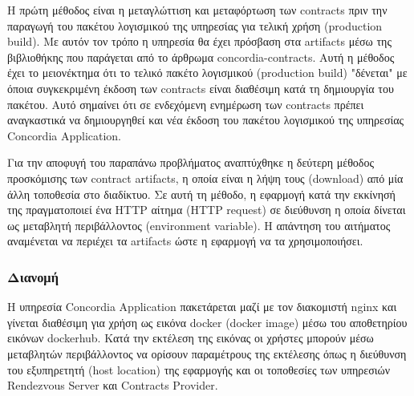 Η πρώτη μέθοδος είναι η μεταγλώττιση και μεταφόρτωση των contracts πριν την παραγωγή του πακέτου λογισμικού της υπηρεσίας για τελική χρήση (production build). Με αυτόν τον τρόπο η υπηρεσία θα έχει πρόσβαση στα artifacts μέσω της βιβλιοθήκης που παράγεται από το άρθρωμα concordia-contracts. Αυτή η μέθοδος έχει το μειονέκτημα ότι το τελικό πακέτο λογισμικού (production build) "δένεται" με όποια συγκεκριμένη έκδοση των contracts είναι διαθέσιμη κατά τη δημιουργία του πακέτου. Αυτό σημαίνει ότι σε ενδεχόμενη ενημέρωση των contracts πρέπει αναγκαστικά να δημιουργηθεί και νέα έκδοση του πακέτου λογισμικού της υπηρεσίας Concordia Application.

Για την αποφυγή του παραπάνω προβλήματος αναπτύχθηκε η δεύτερη μέθοδος προσκόμισης των contract artifacts, η οποία είναι η λήψη τους (download) από μία άλλη τοποθεσία στο διαδίκτυο. Σε αυτή τη μέθοδο, η εφαρμογή κατά την εκκίνησή της πραγματοποιεί ένα HTTP αίτημα (HTTP request) σε διεύθυνση η οποία δίνεται ως μεταβλητή περιβάλλοντος (environment variable). Η απάντηση του αιτήματος αναμένεται να περιέχει τα artifacts ώστε η εφαρμογή να τα χρησιμοποιήσει.

\subsubsection{Διανομή}

Η υπηρεσία Concordia Application πακετάρεται μαζί με τον διακομιστή nginx και γίνεται διαθέσιμη για χρήση ως εικόνα docker (docker image) μέσω του αποθετηρίου εικόνων dockerhub. Κατά την εκτέλεση της εικόνας οι χρήστες μπορούν μέσω μεταβλητών περιβάλλοντος να ορίσουν παραμέτρους της εκτέλεσης όπως η διεύθυνση του εξυπηρετητή (host location) της εφαρμογής και οι τοποθεσίες των υπηρεσιών Rendezvous Server και Contracts Provider.